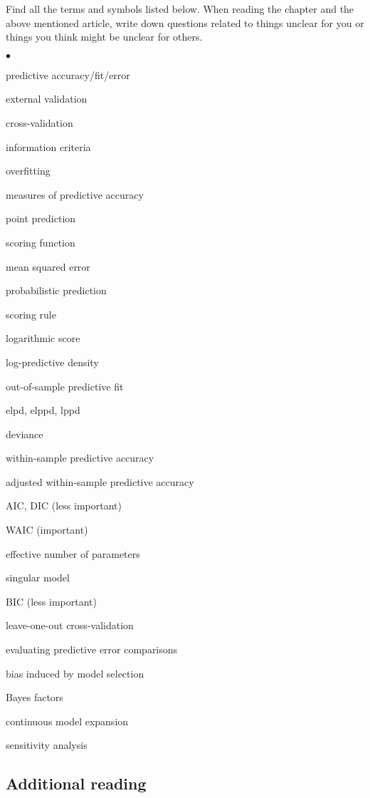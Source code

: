 \documentclass[a4paper,11pt,english]{article}
\begin{document}
Find all the terms and symbols listed below. When reading the chapter
and the above mentioned article, write down questions related to
things unclear for you or things you think might be unclear for
others.
\begin{list}{$\bullet$}{\parsep=0pt\itemsep=2pt}
\item predictive accuracy/fit/error
\item external validation
\item cross-validation
\item information criteria
\item overfitting
\item measures of predictive accuracy
\item point prediction
\item scoring function
\item mean squared error
\item probabilistic prediction
\item scoring rule
\item logarithmic score
\item log-predictive density
\item out-of-sample predictive fit
\item elpd, elppd, lppd
\item deviance
\item within-sample predictive accuracy
\item adjusted within-sample predictive accuracy
\item AIC, DIC (less important)
\item WAIC (important)
\item effective number of parameters
\item singular model
\item BIC (less important)
\item leave-one-out cross-validation
\item evaluating predictive error comparisons
\item bias induced by model selection
\item Bayes factors
\item continuous model expansion
\item sensitivity analysis
\end{list}

 \subsection*{Additional reading}
\end{document}
